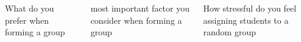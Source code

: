 \begin{columns}
    \centering
    \begin{column}[]{0.3\textwidth}
        \hspace*{-.1in}
        
        {What do you prefer when forming a group}
    \end{column}
    \hspace{-.8in}
    \begin{column}[]{0.3\textwidth}
        
        {most important factor you consider when forming a group}
    \end{column}%
    \hspace{.5in}%
    \begin{column}[]{0.3\textwidth}
        \vspace*{-.1in}
        
        {How stressful do you feel assigning students to a random group}
    \end{column}
\end{columns} 	 	 

